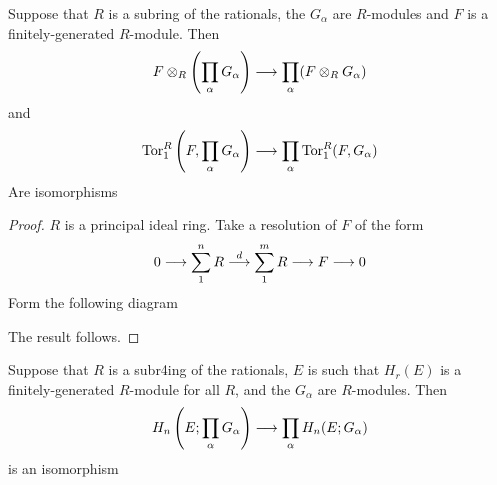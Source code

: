 \documentclass[../main]{subfiles}
\begin{document}
\begin{customlemma}{15.3} \label{lem:p3ch15.3}
Suppose that $R$ is a subring of the rationals, the
$G_\alpha$ are $R$-modules and $F$ is a finitely-generated $R$-module. Then 
$$F\otimes_R \left(\prod_\alpha G_\alpha\right)\overset{}{\longrightarrow} \prod_\alpha (F\otimes_R G_\alpha)$$
and
$$\operatorname{\mathop{\mathrm{Tor}}}_1^R\left(F,\prod_\alpha G_\alpha\right) \overset{}{\longrightarrow} \prod_\alpha \operatorname{\mathop{\mathrm{Tor}}}_1^R(F,G_\alpha) $$ %
Are isomorphisms
\end{customlemma}
\begin{proof}
$R$ is a principal ideal ring. Take a resolution of $F$ of the form
$$0\overset{}{\longrightarrow} \sum_1^n R \overset{d}{\longrightarrow} \sum_1^m R\overset{}{\longrightarrow} F\overset{}{\longrightarrow}0$$
Form the following diagram

The result follows.
\end{proof}
\begin{customlemma}{15.4}\label{lem:p3ch15.4}
Suppose that $R$ is a subr4ing of the rationals, $E$ is such that $H_r(E)$ is a finitely-generated $R$-module for all $R$, and the $G_\alpha$ are $R$-modules. Then $$H_n\left(E;\prod_\alpha G_\alpha\right)\overset{}{\longrightarrow} \prod_\alpha H_n(E;G_\alpha)$$
is an isomorphism
\end{customlemma}
\end{document}
